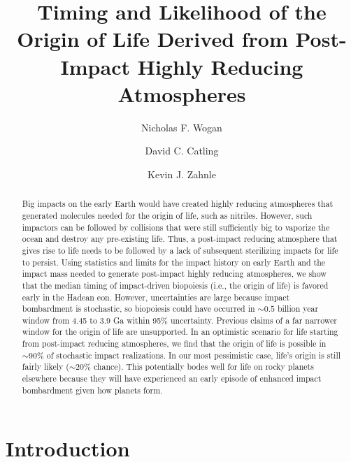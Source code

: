 \documentclass[manuscript]{aastex63}
\begin{document}
\title{Timing and Likelihood of the Origin of Life Derived from Post-Impact Highly Reducing Atmospheres}

\author{Nicholas F. Wogan}

\author{David C. Catling}

\author{Kevin J. Zahnle}

\begin{abstract}
Big impacts on the early Earth would have created highly reducing atmospheres that generated molecules needed for the origin of life, such as nitriles. However, such impactors can be followed by collisions that were still sufficiently big to vaporize the ocean and destroy any pre-existing life. Thus, a post-impact reducing atmosphere that gives rise to life needs to be followed by a lack of subsequent sterilizing impacts for life to persist. Using statistics and limits for the impact history on early Earth and the impact mass needed to generate post-impact highly reducing atmospheres, we show that the median timing of impact-driven biopoiesis (i.e., the origin of life) is favored early in the Hadean eon. However, uncertainties are large because impact bombardment is stochastic, so biopoiesis could have occurred in $\sim 0.5$ billion year window from 4.45 to 3.9 Ga within 95\% uncertainty. Previous claims of a far narrower window for the origin of life are unsupported. In an optimistic scenario for life starting from post-impact reducing atmospheres, we find that the origin of life is possible in $\sim 90\%$ of stochastic impact realizations. In our most pessimistic case, life's origin is still fairly likely ($\sim 20\%$ chance). This potentially bodes well for life on rocky planets elsewhere because they will have experienced an early episode of enhanced impact bombardment given how planets form.
\end{abstract}

\section{Introduction}
\end{document}
